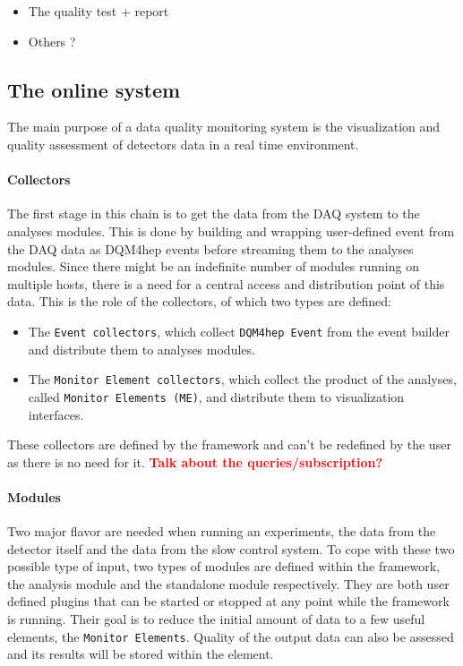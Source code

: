 \documentclass{webofc}
\begin{document}
\begin{itemize}
  \item The quality test + report
  \item Others ?
\end{itemize}

\subsection{The online system}
\label{subsec:online}
The main purpose of a data quality monitoring system is the visualization and quality assessment of detectors data in a real time environment.

\paragraph{Collectors}\label{par:Collectors}
The first stage in this chain is to get the data from the DAQ system to the analyses modules.
This is done by building and wrapping user-defined event from the DAQ data as DQM4hep events before streaming them to the analyses modules.
Since there might be an indefinite number of modules running on multiple hosts, there is a need for a central access and distribution point of this data. This is the role of the collectors, of which two types are defined:

\begin{itemize}
  \item The \texttt{Event collectors}, which collect \texttt{DQM4hep Event} from the event builder and distribute them to analyses modules.  
  \item The \texttt{Monitor Element collectors}, which collect the product of the analyses, called \texttt{Monitor Elements (ME)}, and distribute them to visualization interfaces.
\end{itemize}
These collectors are defined by the framework and can't be redefined by the user as there is no need for it. 
\textcolor{red}{\textbf{Talk about the queries/subscription?}}


\paragraph{Modules}\label{par:Modules}
Two major flavor are needed when running an experiments, the data from the detector itself and the data from the slow control system.
To cope with these two possible type of input, two types of modules are defined within the framework, the analysis module and the standalone module respectively.
They are both user defined plugins that can be started or stopped at any point while the framework is running. Their goal is to reduce the initial amount of data to a few useful elements, the \texttt{Monitor Elements}. Quality of the output data can also be assessed and its results will be stored within the element.
\end{document}
